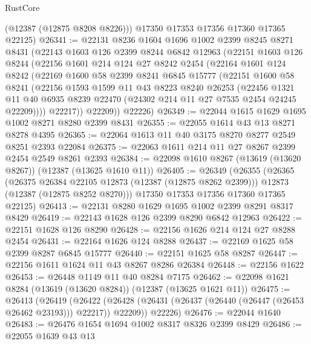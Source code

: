 \begin{lexlean}{RustCore}
\begin{coremodule}
        (@12387 (@12875 @8208 @8226)))
      @17350
      @17353
      @17356
      @17360
      @17365
      @22125)
@26341 := @22131
    @8236
    @1604
    @1696
    @1002
    @2399
    @8245
    @8271
    @8431
    (@22143
      @1603
      @126
      @2399
      @8244
      @6842
      @12963
      (@22151
        @1603
        @126
        @8244
        (@22156
          @1601
          @214
          @124
          @27
          @8242
          @2454
          (@22164
            @1601
            @124
            @8242
            (@22169
              @1600
              @58
              @2399
              @8241
              @6845
              @15777
              (@22151
                @1600
                @58
                @8241
                (@22156
                  @1593
                  @1599
                  @11
                  @43
                  @8223
                  @8240
                  @26253
                  (@22456
                    @1321
                    @11
                    @40
                    @6935
                    @8239
                    @22470
                    (@24302 @214 @11 @27 @7535 @2454 @24245 @22209))))
              @22217))
          @22209))
      @22226)
@26349 := @22044 @1615 @1629 @1695 @1002 @8271 @8280 @2399 @8431
@26355 := @22055 @1614 @43 @13 @8271 @8278 @4395
@26365 := @22064 @1613 @11 @40 @3175 @8270 @8277 @2549 @8251 @2393 @22084
@26375 := @22063 @1611 @214 @11 @27 @8267 @2399 @2454 @2549 @8261 @2393
@26384 := @22098 @1610 @8267 (@13619 (@13620 @8267)) (@12387 (@13625 @1610 @11))
@26405 := @26349
    (@26355
      (@26365
        (@26375 @26384 @22105 @12873 (@12387 (@12875 @8262 @2399)))
        @12873
        (@12387 (@12875 @8252 @8270)))
      @17350
      @17353
      @17356
      @17360
      @17365
      @22125)
@26413 := @22131 @8280 @1629 @1695 @1002 @2399 @8291 @8317 @8429
@26419 := @22143 @1628 @126 @2399 @8290 @6842 @12963
@26422 := @22151 @1628 @126 @8290
@26428 := @22156 @1626 @214 @124 @27 @8288 @2454
@26431 := @22164 @1626 @124 @8288
@26437 := @22169 @1625 @58 @2399 @8287 @6845 @15777
@26440 := @22151 @1625 @58 @8287
@26447 := @22156 @1611 @1624 @11 @43 @8267 @8286 @26384
@26448 := @22156 @1622
@26453 := @26448 @1149 @11 @40 @8284 @7175
@26462 := @22098 @1621 @8284 (@13619 (@13620 @8284)) (@12387 (@13625 @1621 @11))
@26475 := @26413
    (@26419
      (@26422 (@26428 (@26431 (@26437 (@26440 (@26447 (@26453 @26462 @23193))) @22217)) @22209))
      @22226)
@26476 := @22044 @1640
@26483 := @26476 @1654 @1694 @1002 @8317 @8326 @2399 @8429
@26486 := @22055 @1639 @43 @13

\end{coremodule}
\end{lexlean}
